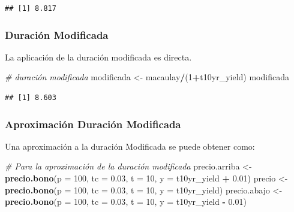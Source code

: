 \documentclass[12pt,]{book}
\newenvironment{Shaded}{\begin{snugshade}}{\end{snugshade}}
\newcommand{\KeywordTok}[1]{\textcolor[rgb]{0.13,0.29,0.53}{\textbf{#1}}}
\newcommand{\DataTypeTok}[1]{\textcolor[rgb]{0.13,0.29,0.53}{#1}}
\newcommand{\DecValTok}[1]{\textcolor[rgb]{0.00,0.00,0.81}{#1}}
\newcommand{\FloatTok}[1]{\textcolor[rgb]{0.00,0.00,0.81}{#1}}
\newcommand{\StringTok}[1]{\textcolor[rgb]{0.31,0.60,0.02}{#1}}
\newcommand{\CommentTok}[1]{\textcolor[rgb]{0.56,0.35,0.01}{\textit{#1}}}
\newcommand{\OperatorTok}[1]{\textcolor[rgb]{0.81,0.36,0.00}{\textbf{#1}}}
\newcommand{\NormalTok}[1]{#1}
\begin{document}
\begin{verbatim}
## [1] 8.817
\end{verbatim}

\subsubsection{Duración Modificada}\label{duracion-modificada}

La aplicación de la duración modificada es directa.

\begin{Shaded}
\begin{Highlighting}[]
\CommentTok{# duración modificada}
\NormalTok{modificada <-}\StringTok{ }\NormalTok{macaulay}\OperatorTok{/}\NormalTok{(}\DecValTok{1}\OperatorTok{+}\NormalTok{t10yr_yield)}
\NormalTok{modificada }
\end{Highlighting}
\end{Shaded}

\begin{verbatim}
## [1] 8.603
\end{verbatim}

\subsubsection{Aproximación Duración
Modificada}\label{aproximacion-duracion-modificada}

Una aproximación a la duración Modificada se puede obtener como:

\begin{Shaded}
\begin{Highlighting}[]
\CommentTok{# Para la aproximación de la duración modificada}
\NormalTok{precio.arriba <-}\StringTok{ }\KeywordTok{precio.bono}\NormalTok{(}\DataTypeTok{p =} \DecValTok{100}\NormalTok{, }\DataTypeTok{tc =} \FloatTok{0.03}\NormalTok{, }\DataTypeTok{t =} \DecValTok{10}\NormalTok{, }\DataTypeTok{y =}\NormalTok{ t10yr_yield }\OperatorTok{+}\StringTok{ }\FloatTok{0.01}\NormalTok{)}
\NormalTok{precio        <-}\StringTok{ }\KeywordTok{precio.bono}\NormalTok{(}\DataTypeTok{p =} \DecValTok{100}\NormalTok{, }\DataTypeTok{tc =} \FloatTok{0.03}\NormalTok{, }\DataTypeTok{t =} \DecValTok{10}\NormalTok{, }\DataTypeTok{y =}\NormalTok{ t10yr_yield)}
\NormalTok{precio.abajo  <-}\StringTok{ }\KeywordTok{precio.bono}\NormalTok{(}\DataTypeTok{p =} \DecValTok{100}\NormalTok{, }\DataTypeTok{tc =} \FloatTok{0.03}\NormalTok{, }\DataTypeTok{t =} \DecValTok{10}\NormalTok{, }\DataTypeTok{y =}\NormalTok{ t10yr_yield }\OperatorTok{-}\StringTok{ }\FloatTok{0.01}\NormalTok{)}
\end{Highlighting}
\end{Shaded}
\end{document}
